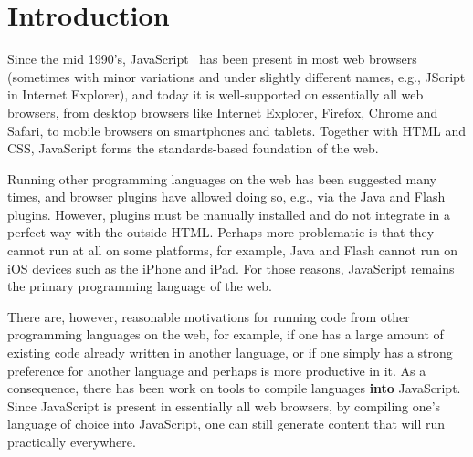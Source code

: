 \documentclass[preprint,10pt]{sigplanconf}
\begin{document}



\bigskip


\section{Introduction}

Since the mid 1990's, JavaScript~\cite{js} has been present in most web browsers (sometimes
with minor variations and under slightly different names, e.g., JScript in Internet
Explorer), and today it is
well-supported on essentially all web browsers, from desktop browsers like
Internet Explorer, Firefox, Chrome and Safari, to mobile browsers on smartphones
and tablets. Together with HTML and CSS, JavaScript forms the standards-based
foundation of the web.

Running other programming languages on the web has been suggested many times,
and browser plugins have allowed doing so, e.g., via the Java
and Flash plugins. However, plugins must be manually installed and do not integrate in
a perfect way with the outside HTML. Perhaps more problematic is that they cannot run
at all on some platforms, for example, Java and Flash cannot run on iOS devices such as the iPhone
and iPad. For those reasons, JavaScript remains
the primary programming language of the web.

There are, however, reasonable motivations for running code from
other programming languages on the web, for example, if one has a large
amount of existing code already written in another language, or if one
simply has a strong preference for another language and perhaps is
more productive in it. As a consequence, there has been work on tools to compile languages
\textbf{into} JavaScript. Since JavaScript is present in essentially all web
browsers, by compiling one's language of choice into JavaScript, one
can still generate content that will run practically everywhere.
\end{document}
